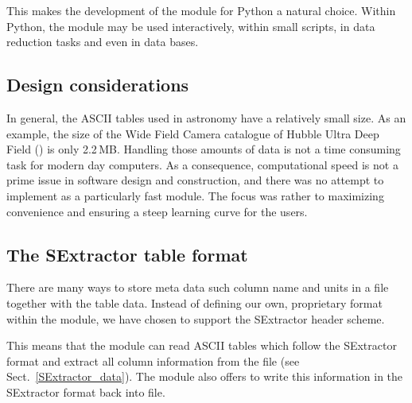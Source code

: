 This makes the  development of the \AAD module for Python a natural
choice.
Within Python, the \AAD module may be used interactively, within small scripts,
in data reduction tasks and even in data bases.

\subsection{Design considerations}
\label{design_considerations}
In general, the ASCII tables used in astronomy have a relatively small size.
As an example, the size of the Wide Field Camera catalogue of
Hubble Ultra Deep Field
()
is only 2.2\,MB. Handling those amounts of data is not a time consuming task for modern day computers. As a consequence, computational speed is not a prime issue in software design and
construction, and there was no attempt to implement \AAD as a particularly fast
module. The focus was rather to maximizing convenience and ensuring a
steep learning curve for the users.\\

\subsection{The SExtractor table format}
\label{sex_format}
There are many ways to store meta data such column name and units in a file
together with the table data. Instead of defining our own, proprietary format
within the \AAD module, we have chosen to support the
SExtractor header scheme.

This means that the module can read ASCII tables which follow the SExtractor
format and extract all column information from the file
(see Sect.\ \ref{SExtractor_data}). The module also offers to write this information
in the SExtractor format back into file.

